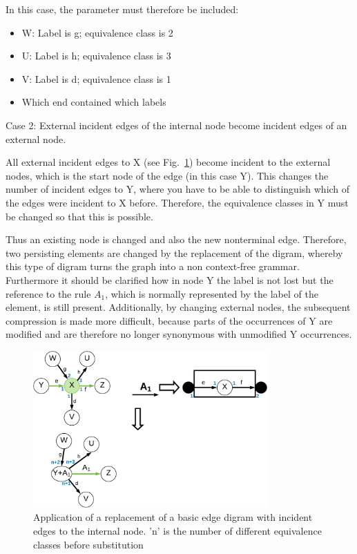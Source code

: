 \documentclass[a4paper]{scrartcl}
\begin{document}
In this case, the parameter must therefore be included:
\begin{itemize}
\item W: Label is g; equivalence class is 2
\item U: Label is h; equivalence class is 3
\item V: Label is d; equivalence class is 1
\item Which end contained which labels
\end{itemize}

Case 2: External incident edges of the internal node become incident edges of an external node. 

All external incident edges to X (see Fig.~\ref{fig:incedentEdges2}) become incident to the external nodes, which is the start node of the edge (in this case Y). This changes the number of incident edges to Y, where you have to be able to distinguish which of the edges were incident to X before. Therefore, the equivalence classes in Y must be changed so that this is possible.

Thus an existing node is changed and also the new nonterminal edge. Therefore, two persisting elements are changed by the replacement of the digram, whereby this type of digram turns the graph into a non context-free grammar. Furthermore it should be clarified how in node Y the label is not lost but the reference to the rule $A_1$, which is normally represented by the label of the element, is still present. Additionally, by changing external nodes, the subsequent compression is made more difficult, because parts of the occurrences of Y are modified and are therefore no longer synonymous with unmodified Y occurrences.

\begin{figure}[h]
	\centering
	\includegraphics[width=0.8\textwidth]{img/edgeDigram_extern}
	\caption{Application of a replacement of a basic edge digram with incident edges to the internal node. 'n' is the number of different equivalence classes before substitution }
	\label{fig:incedentEdges2}
\end{figure}
\end{document}
